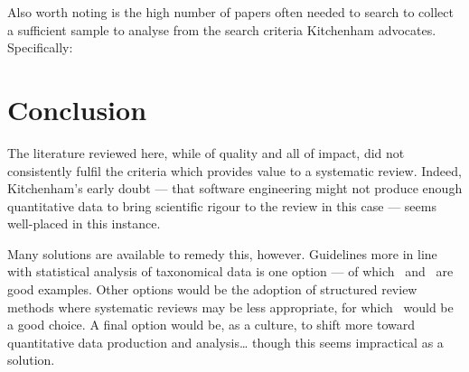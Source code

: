 Also worth noting is the high number of papers often needed to search to collect a sufficient sample to analyse from the search criteria Kitchenham advocates. Specifically:

\begin{table}[h]
\centering
{}
\caption{Papers reviewed to achieve desired samples}
\end{table}
\section{Conclusion}

The literature reviewed here, while of quality and all of impact, did not consistently fulfil the criteria which provides value to a systematic review. Indeed, Kitchenham's early doubt --- that software engineering might not produce enough quantitative data to bring scientific rigour to the review in this case --- seems well-placed in this instance.\par

Many solutions are available to remedy this, however. Guidelines more in line with statistical analysis of taxonomical data is one option --- of which~\cite{Kitchenham2013} and~\cite{Kampenes2007} are good examples. Other options would be the adoption of structured review methods where systematic reviews may be less appropriate, for which~\cite{Webster2002} would be a good choice. A final option would be, as a culture, to shift more toward quantitative data production and analysis\dots{} though this seems impractical as a solution.\par







